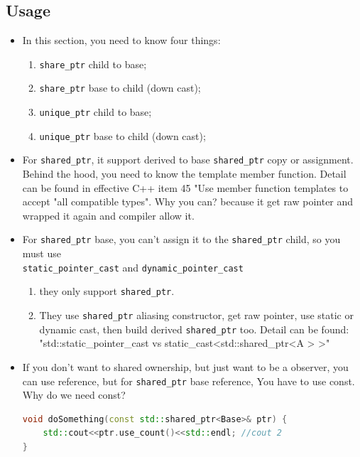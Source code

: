 \documentclass[a4paper,11pt,twoside]{book}
\begin{document}
\subsection{Usage}
\begin{itemize}
\item In this section, you need to know four things:
\begin{enumerate}
\item \texttt{share\_ptr} child to base;
\item \texttt{share\_ptr} base to child (down cast);
\item \texttt{unique\_ptr} child to base;
\item \texttt{unique\_ptr} base to child (down cast);
\end{enumerate}


		\item For \texttt{shared\_ptr}, it support derived to base \texttt{shared\_ptr} copy or assignment. Behind the hood, you need to know the template member function. Detail can be found in effective C++ item 45 "Use member function templates to accept "all compatible types". Why you can? because it get raw pointer and wrapped it again and compiler allow it.

		\item  For \texttt{shared\_ptr} base, you can't assign it to the \texttt{shared\_ptr} child, so you must use \\ \texttt{static\_pointer\_cast} and \texttt{dynamic\_pointer\_cast}
		\begin{enumerate}
			\item they only support \texttt{shared\_ptr}.
			\item They use \texttt{shared\_ptr} aliasing constructor, get raw pointer, use static or dynamic cast, then build derived \texttt{shared\_ptr} too. Detail can be found: \\
			"std::static\_pointer\_cast vs static\_cast<std::shared\_ptr<A > >"
		\end{enumerate}

		\item If you don't want to shared ownership, but just want to be a observer, you can use reference, but for \texttt{shared\_ptr} base reference, You have to use const. Why do we need const?
	
\begin{lstlisting}[frame=single, language=c++, mathescape=true]
void doSomething(const std::shared_ptr<Base>& ptr) {
    std::cout<<ptr.use_count()<<std::endl; //cout 2
}


\end{lstlisting}
\end{itemize}
\end{document}
